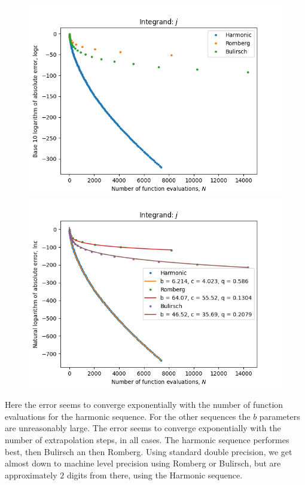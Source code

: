 \begin{figure}[H]
\centering
\begin{minipage}{0.45\textwidth}
\centering
\includegraphics[scale=0.45]{romberg_plots/gaussian_hp.png}
\end{minipage}
\begin{minipage}{0.45\textwidth}
\centering
\includegraphics[scale=0.45]{romberg_plots/gaussian_hp_trend.png}
\end{minipage}
\end{figure}

Here the error seems to converge exponentially with the number of function evaluations for the harmonic sequence. For the other sequences the \(b\) parameters are unreasonably large. The error seems to converge exponentially with the number of extrapolation steps, in all cases. The harmonic sequence performes best, then Bulirsch an then Romberg. Using standard double precision, we get almost down to machine level precision using Romberg or Bulirsch, but are approximately \(2\) digits from there, using the Harmonic sequence.


